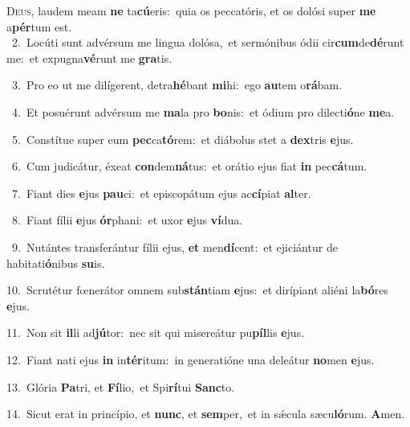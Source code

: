 \lettrine{\initial\textcolor{\initialcolor}{D}}{eus,} laudem meam \textbf{ne} ta\-\textbf{cú}\-eris:~\star quia os peccatóris, et os dolósi super \textbf{me} a\-\textbf{pér}\-tum est.\\
{\numbfont\textcolor{\numbcolor}{~2.}}~Locúti sunt advérsum me lingua dolósa,~\dagger et sermónibus ódii cir\-\textbf{cum}\-de\-\textbf{dé}\-runt me:~\star et expugna\-\textbf{vé}\-runt me \textbf{gra}\-tis.\par
{\numbfont\textcolor{\numbcolor}{~3.}}~Pro eo ut me dilígerent, detra\-\textbf{hé}\-bant \textbf{mi}\-hi:~\star ego \textbf{au}\-tem o\-\textbf{rá}\-bam.\par
{\numbfont\textcolor{\numbcolor}{~4.}}~Et posuérunt advérsum me \textbf{ma}\-la pro \textbf{bo}\-nis:~\star et ódium pro dilecti\-\textbf{ó}\-ne \textbf{me}\-a.\par
{\numbfont\textcolor{\numbcolor}{~5.}}~Constítue super eum \textbf{pec}\-ca\-\textbf{tó}\-rem:~\star et diábolus stet a \textbf{dex}\-tris \textbf{e}\-jus.\par
{\numbfont\textcolor{\numbcolor}{~6.}}~Cum judicátur, éxeat \textbf{con}\-dem\-\textbf{ná}\-tus:~\star et orátio ejus fiat \textbf{in} pec\-\textbf{cá}\-tum.\par
{\numbfont\textcolor{\numbcolor}{~7.}}~Fiant dies \textbf{e}\-jus \textbf{pau}\-ci:~\star et episcopátum ejus ac\-\textbf{cí}\-piat \textbf{al}\-ter.\par
{\numbfont\textcolor{\numbcolor}{~8.}}~Fiant fílii \textbf{e}\-jus \textbf{ór}\-phani:~\star et uxor \textbf{e}\-jus \textbf{ví}\-dua.\par
{\numbfont\textcolor{\numbcolor}{~9.}}~Nutántes transferántur fílii ejus, \textbf{et} men\-\textbf{dí}\-cent:~\star et ejiciántur de habitati\-\textbf{ó}\-nibus \textbf{su}\-is.\par
{\numbfont\textcolor{\numbcolor}{10.}}~Scrutétur fœnerátor omnem sub\-\textbf{stán}\-tiam \textbf{e}\-jus:~\star et dirípiant aliéni la\-\textbf{bó}\-res \textbf{e}\-jus.\par
{\numbfont\textcolor{\numbcolor}{11.}}~Non sit \textbf{il}\-li ad\-\textbf{jú}\-tor:~\star nec sit qui misereátur pu\-\textbf{píl}\-lis \textbf{e}\-jus.\par
{\numbfont\textcolor{\numbcolor}{12.}}~Fiant nati ejus \textbf{in} in\-\textbf{tér}\-itum:~\star in generatióne una deleátur \textbf{no}\-men \textbf{e}\-jus.\par
{\numbfont\textcolor{\numbcolor}{13.}}~Glória \textbf{Pa}\-tri, et \textbf{Fí}\-lio,~\star et Spi\-\textbf{rí}\-tui \textbf{Sanc}\-to.\par
{\numbfont\textcolor{\numbcolor}{14.}}~Sicut erat in princípio, et \textbf{nunc}\-, et \textbf{sem}\-per,~\star et in sǽcula sæcu\-\textbf{ló}\-rum. \textbf{A}\-men.\par
